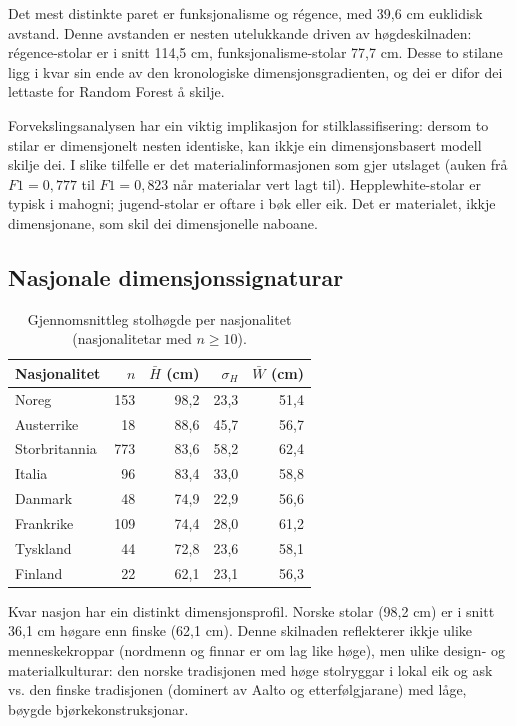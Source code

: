 \documentclass[10pt, a4paper, twocolumn]{article}
\begin{document}
Det mest distinkte paret er funksjonalisme og régence, med 39,6 cm euklidisk avstand. Denne avstanden er nesten utelukkande driven av høgdeskilnaden: régence-stolar er i snitt 114,5 cm, funksjonalisme-stolar 77,7 cm. Desse to stilane ligg i kvar sin ende av den kronologiske dimensjonsgradienten, og dei er difor dei lettaste for Random Forest å skilje.

Forvekslingsanalysen har ein viktig implikasjon for stilklassifisering: dersom to stilar er dimensjonelt nesten identiske, kan ikkje ein dimensjonsbasert modell skilje dei. I slike tilfelle er det materialinformasjonen som gjer utslaget (auken frå $F1 = 0{,}777$ til $F1 = 0{,}823$ når materialar vert lagt til). Hepplewhite-stolar er typisk i mahogni; jugend-stolar er oftare i bøk eller eik. Det er materialet, ikkje dimensjonane, som skil dei dimensjonelle naboane.


\subsection{Nasjonale dimensjonssignaturar}

\begin{table}[H]
\centering
\caption{Gjennomsnittleg stolhøgde per nasjonalitet (nasjonalitetar med $n \geq 10$).}
\label{tab:nat_dims}
\begin{tabular}{@{}lrrrr@{}}
\toprule
\textbf{Nasjonalitet} & \textbf{$n$} & \textbf{$\bar{H}$ (cm)} & \textbf{$\sigma_H$} & \textbf{$\bar{W}$ (cm)} \\
\midrule
Noreg & 153 & 98,2 & 23,3 & 51,4 \\
Austerrike & 18 & 88,6 & 45,7 & 56,7 \\
Storbritannia & 773 & 83,6 & 58,2 & 62,4 \\
Italia & 96 & 83,4 & 33,0 & 58,8 \\
Danmark & 48 & 74,9 & 22,9 & 56,6 \\
Frankrike & 109 & 74,4 & 28,0 & 61,2 \\
Tyskland & 44 & 72,8 & 23,6 & 58,1 \\
Finland & 22 & 62,1 & 23,1 & 56,3 \\
\bottomrule
\end{tabular}
\end{table}

Kvar nasjon har ein distinkt dimensjonsprofil. Norske stolar (98,2 cm) er i snitt 36,1 cm høgare enn finske (62,1 cm). Denne skilnaden reflekterer ikkje ulike menneskekroppar (nordmenn og finnar er om lag like høge), men ulike design- og materialkulturar: den norske tradisjonen med høge stolryggar i lokal eik og ask vs. den finske tradisjonen (dominert av Aalto og etterfølgjarane) med låge, bøygde bjørkekonstruksjonar.
\end{document}
